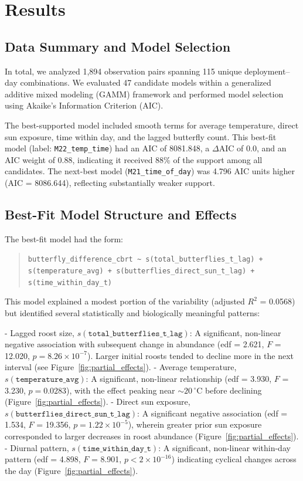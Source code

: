 \section{Results}

\subsection{Data Summary and Model Selection}

In total, we analyzed 1,894 observation pairs spanning 115 unique deployment–day combinations. We evaluated 47 candidate models within a generalized additive mixed modeling (GAMM) framework and performed model selection using Akaike's Information Criterion (AIC).

The best-supported model included smooth terms for average temperature, direct sun exposure, time within day, and the lagged butterfly count. This best-fit model (label: \texttt{M22\_temp\_time}) had an AIC of 8081.848, a \(\Delta\)AIC of 0.0, and an AIC weight of 0.88, indicating it received 88\% of the support among all candidates. The next-best model (\texttt{M21\_time\_of\_day}) was 4.796 AIC units higher (AIC = 8086.644), reflecting substantially weaker support.



\subsection{Best-Fit Model Structure and Effects}

The best-fit model had the form:
\begin{quote}
\texttt{butterfly\_difference\_cbrt \textasciitilde\ s(total\_butterflies\_t\_lag) + s(temperature\_avg) + s(butterflies\_direct\_sun\_t\_lag) + s(time\_within\_day\_t)}
\end{quote}

This model explained a modest portion of the variability (adjusted \(R^2\) = 0.0568) but identified several statistically and biologically meaningful patterns:

- Lagged roost size, \(s(\texttt{total\_butterflies\_t\_lag})\): A significant, non-linear negative association with subsequent change in abundance (edf = 2.621, \(F\) = 12.020, \(p = 8.26 \times 10^{-7}\)). Larger initial roosts tended to decline more in the next interval (see Figure~\ref{fig:partial_effects}).
- Average temperature, \(s(\texttt{temperature\_avg})\): A significant, non-linear relationship (edf = 3.930, \(F\) = 3.230, \(p = 0.0283\)), with the effect peaking near \(\sim\!20\,^{\circ}\mathrm{C}\) before declining (Figure~\ref{fig:partial_effects}).
- Direct sun exposure, \(s(\texttt{butterflies\_direct\_sun\_t\_lag})\): A significant negative association (edf = 1.534, \(F\) = 19.356, \(p = 1.22 \times 10^{-5}\)), wherein greater prior sun exposure corresponded to larger decreases in roost abundance (Figure~\ref{fig:partial_effects}).
- Diurnal pattern, \(s(\texttt{time\_within\_day\_t})\): A significant, non-linear within-day pattern (edf = 4.898, \(F\) = 8.901, \(p < 2 \times 10^{-16}\)) indicating cyclical changes across the day (Figure~\ref{fig:partial_effects}).

